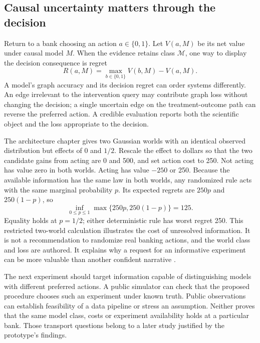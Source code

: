\subsection{Causal uncertainty matters through the decision}

Return to a bank choosing an action $a\in\{0,1\}$. Let $V(a,M)$ be its net
value under causal model $M$. When the evidence retains class $\mathcal M$,
one way to display the decision consequence is regret
\begin{equation}
 R(a,M)=\max_{b\in\{0,1\}}V(b,M)-V(a,M).
 \label{exec13:frontier-regret}
\end{equation}
A model's graph accuracy and its decision regret can order systems differently.
An edge irrelevant to the intervention query may contribute graph loss without
changing the decision; a single uncertain edge on the treatment-outcome path
can reverse the preferred action. A credible evaluation reports both the
scientific object and the loss appropriate to the decision.

The architecture chapter gives two Gaussian worlds with an identical observed
distribution but effects of 0 and $1/2$. Rescale the effect to dollars so that
the two candidate gains from acting are 0 and 500, and set action cost to 250.
Not acting has value zero in both worlds. Acting has value $-250$ or 250.
Because the available information has the same law in both worlds, any
randomized rule acts with the same marginal probability $p$. Its expected
regrets are $250p$ and $250(1-p)$, so
\begin{equation}
 \inf_{0\leq p\leq1}\max\{250p,250(1-p)\}=125.
 \label{exec13:frontier-minimax}
\end{equation}
Equality holds at $p=1/2$; either deterministic rule has worst regret 250.
This restricted two-world calculation illustrates the cost of unresolved
information. It is not a recommendation to randomize real banking actions,
and the world class and loss are authored. It explains why a request for an
informative experiment can be more valuable than another confident narrative
\cite{exec13_architecture_exact,exec13_frontier_exact}.

The next experiment should target information capable of distinguishing models
with different preferred actions. A public simulator can check that the
proposed procedure chooses such an experiment under known truth. Public
observations can establish feasibility of a data pipeline or stress an
assumption. Neither proves that the same model class, costs or experiment
availability holds at a particular bank. Those transport questions belong to
a later study justified by the prototype's findings.

